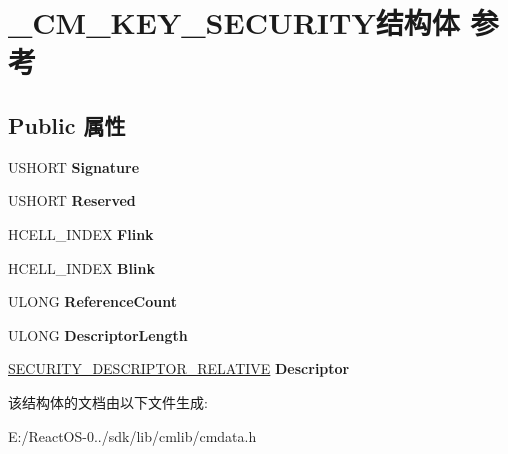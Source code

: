 \hypertarget{struct___c_m___k_e_y___s_e_c_u_r_i_t_y}{}\section{\+\_\+\+C\+M\+\_\+\+K\+E\+Y\+\_\+\+S\+E\+C\+U\+R\+I\+T\+Y结构体 参考}
\label{struct___c_m___k_e_y___s_e_c_u_r_i_t_y}
\subsection*{Public 属性}
\begin{DoxyCompactItemize}
\item 
\mbox{\label{struct___c_m___k_e_y___s_e_c_u_r_i_t_y_ab29bd2b35c5348f3ae799fcbf3fe09d5}} 
U\+S\+H\+O\+RT {\bfseries Signature}
\item 
\mbox{\label{struct___c_m___k_e_y___s_e_c_u_r_i_t_y_a8022cefb15faa0f2320f55afb47d492f}} 
U\+S\+H\+O\+RT {\bfseries Reserved}
\item 
\mbox{\label{struct___c_m___k_e_y___s_e_c_u_r_i_t_y_a6222eba44f63dc44d7e791c6dfc103a1}} 
H\+C\+E\+L\+L\+\_\+\+I\+N\+D\+EX {\bfseries Flink}
\item 
\mbox{\label{struct___c_m___k_e_y___s_e_c_u_r_i_t_y_aa6abd6f7333f62412b8ca6b0b59cd4be}} 
H\+C\+E\+L\+L\+\_\+\+I\+N\+D\+EX {\bfseries Blink}
\item 
\mbox{\label{struct___c_m___k_e_y___s_e_c_u_r_i_t_y_a787d870019c329d00e4688ad8810a120}} 
U\+L\+O\+NG {\bfseries Reference\+Count}
\item 
\mbox{\label{struct___c_m___k_e_y___s_e_c_u_r_i_t_y_a3d612db3309807dcca67e9dcf5c808da}} 
U\+L\+O\+NG {\bfseries Descriptor\+Length}
\item 
\mbox{\label{struct___c_m___k_e_y___s_e_c_u_r_i_t_y_aff6100dcdf5bdb97bc98d7edd52da284}} 
\hyperlink{struct___s_e_c_u_r_i_t_y___d_e_s_c_r_i_p_t_o_r___r_e_l_a_t_i_v_e}{S\+E\+C\+U\+R\+I\+T\+Y\+\_\+\+D\+E\+S\+C\+R\+I\+P\+T\+O\+R\+\_\+\+R\+E\+L\+A\+T\+I\+VE} {\bfseries Descriptor}
\end{DoxyCompactItemize}


该结构体的文档由以下文件生成\+:\begin{DoxyCompactItemize}
\item 
E\+:/\+React\+O\+S-\/0../sdk/lib/cmlib/cmdata.\+h\end{DoxyCompactItemize}

